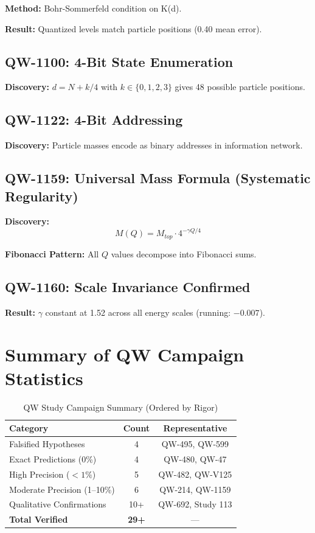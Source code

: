 \documentclass[11pt,a4paper]{book}
\theoremstyle{remark}
\begin{document}
\textbf{Method:} Bohr-Sommerfeld condition on K(d).

\textbf{Result:} Quantized levels match particle positions (0.40 mean error).

\subsection{QW-1100: 4-Bit State Enumeration}

\textbf{Discovery:} $d = N + k/4$ with $k \in \{0,1,2,3\}$ gives 48 possible particle positions.

\subsection{QW-1122: 4-Bit Addressing}

\textbf{Discovery:} Particle masses encode as binary addresses in information network.

\subsection{QW-1159: Universal Mass Formula (Systematic Regularity)}

\textbf{Discovery:}
\begin{equation}
\boxed{M(Q) = M_{top} \cdot 4^{-\gamma Q/4}}
\end{equation}

\textbf{Fibonacci Pattern:} All $Q$ values decompose into Fibonacci sums.

\subsection{QW-1160: Scale Invariance Confirmed}

\textbf{Result:} $\gamma$ constant at 1.52 across all energy scales (running: $-0.007$).

\section{Summary of QW Campaign Statistics}

\begin{table}[H]
\centering
\caption{QW Study Campaign Summary (Ordered by Rigor)}
\begin{tabular}{|l|c|c|}
\hline
\textbf{Category} & \textbf{Count} & \textbf{Representative} \\
\hline
Falsified Hypotheses & 4 & QW-495, QW-599 \\
Exact Predictions (0\%) & 4 & QW-480, QW-47 \\
High Precision ($<1\%$) & 5 & QW-482, QW-V125 \\
Moderate Precision (1--10\%) & 6 & QW-214, QW-1159 \\
Qualitative Confirmations & 10+ & QW-692, Study 113 \\
\hline
\textbf{Total Verified} & \textbf{29+} & --- \\
\hline
\end{tabular}
\end{table}
\end{document}
